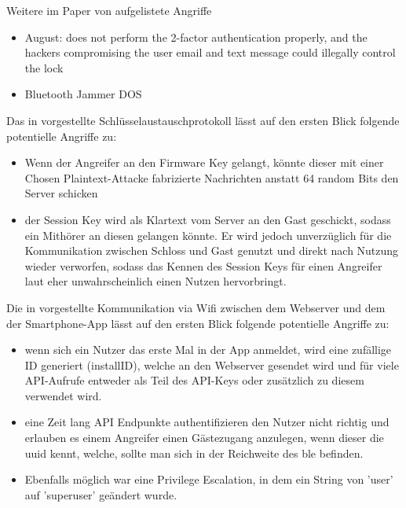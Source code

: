		Weitere im Paper von \citeauthor{Ye2017} aufgelistete Angriffe
	\begin{itemize}
	    \item August: does not perform the 2-factor authentication properly, and the hackers compromising the user email and text message could illegally control the lock
		\item Bluetooth Jammer \textrightarrow DOS
	\end{itemize}
	
	Das in  vorgestellte Schlüsselaustauschprotokoll lässt auf den ersten Blick folgende potentielle Angriffe zu\cite{Fuller2017}: 
	\begin{itemize}
	    \item Wenn der Angreifer an den Firmware Key gelangt, könnte dieser mit einer Chosen Plaintext-Attacke fabrizierte Nachrichten anstatt 64 random Bits den Server schicken  
	    \item der Session Key wird als Klartext vom Server an den Gast geschickt, sodass ein Mithörer an diesen gelangen könnte.
	        Er wird jedoch unverzüglich für die Kommunikation zwischen Schloss und Gast genutzt und direkt nach Nutzung wieder verworfen, sodass das Kennen des Session Keys für einen Angreifer laut \citeauthor{Fuller2017} eher unwahrscheinlich einen Nutzen hervorbringt.
	\end{itemize}
	
	Die in  vorgestellte Kommunikation via Wifi zwischen dem Webserver und dem der Smartphone-App lässt auf den ersten Blick folgende potentielle Angriffe zu\cite{Fuller2017}\cite{Lariviere2015}: 
	\begin{itemize}
	    \item wenn sich ein Nutzer das erste Mal in der App anmeldet, wird eine zufällige ID generiert (installID), welche an den Webserver gesendet wird und für viele API-Aufrufe entweder als Teil des API-Keys oder zusätzlich zu diesem verwendet wird.
	    \item eine Zeit lang API Endpunkte authentifizieren den Nutzer nicht richtig und erlauben es einem Angreifer einen Gästezugang anzulegen, wenn dieser die \gls{uuid} kennt, welche, sollte man sich in der Reichweite des \gls{ble} befinden.
	    \item Ebenfalls möglich war eine Privilege Escalation, in dem ein String von 'user' auf 'superuser' geändert wurde.
	\end{itemize}
	
